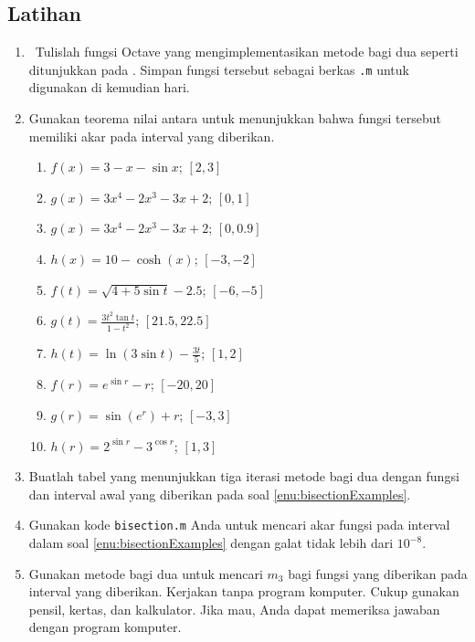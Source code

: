 \subsection{Latihan}
\begin{enumerate}
\item \label{exc:bisectionCode}\octave\  Tulislah fungsi Octave yang mengimplementasikan
metode bagi dua seperti ditunjukkan pada .
Simpan fungsi tersebut sebagai berkas \texttt{.m} untuk digunakan
di kemudian hari.
\item \label{enu:bisectionExamples}Gunakan teorema nilai antara untuk menunjukkan
bahwa fungsi tersebut memiliki akar pada interval yang diberikan.

\begin{enumerate}
\item $f(x)=3-x-\sin x$; $[2,3]$
\item $g(x)=3x^{4}-2x^{3}-3x+2$; $[0,1]$
\item \label{exc:bisection1}$g(x)=3x^{4}-2x^{3}-3x+2$; $[0,0.9]$ \hasasolution 
\item $h(x)=10-\cosh(x)$; $[-3,-2]$
\item \label{enu:failure1}$f(t)=\sqrt{4+5\sin t}-2.5$; $[-6,-5]$
\item \label{enu:failure2}$g(t)=\frac{3t^{2}\tan t}{1-t^{2}}$; $[21.5,22.5]$ \hasasolution 
\item \label{enu:failure3}$h(t)=\ln(3\sin t)-\frac{3t}{5}$; $[1,2]$
\item $f(r)=e^{\sin r}-r$; $[-20,20]$
\item $g(r)=\sin(e^{r})+r$; $[-3,3]$
\item $h(r)=2^{\sin r}-3^{\cos r}$; $[1,3]$
\end{enumerate}
\item \label{exc:bisection2}Buatlah tabel yang menunjukkan tiga iterasi
metode bagi dua dengan fungsi dan interval awal yang diberikan pada
soal \ref{enu:bisectionExamples}. \haspartwithsolution 
\item \label{exc:bisection3}Gunakan kode \texttt{bisection.m} Anda untuk
mencari akar fungsi pada interval dalam soal \ref{enu:bisectionExamples}
dengan galat tidak lebih dari $10^{-8}$. \haspartwithanswer 
\item \label{exc:bisection}Gunakan metode bagi dua untuk mencari $m_{3}$
bagi fungsi yang diberikan pada interval yang diberikan. Kerjakan
tanpa program komputer. Cukup gunakan pensil, kertas, dan kalkulator.
Jika mau, Anda dapat memeriksa jawaban dengan program komputer.  \hasananswer 


\end{enumerate}
